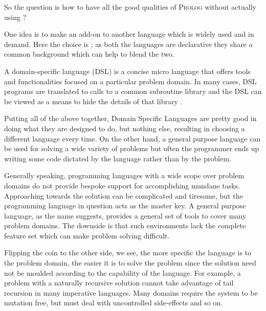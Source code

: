 \documentclass[thesis-solanki.tex]{subfiles}
\begin{document}
So the question is how to have all the good qualities of \textsc{Prolog} without actually using ?

One idea is to make  an add-on to another language which is widely used and in demand.
Here the choice is ; as both the languages are declarative they share a common background which
can help to blend the two.

A domain-specific language (DSL) is a concise micro language that offers tools and functionalities focused on a
particular problem domain.
In many cases, DSL programs are translated to calls to a common subroutine library and the DSL can be viewed as a
means to hide the details of that library \cite{van2000domain}.

Putting all of the above together, Domain Specific Languages
are pretty good in doing what they are designed to do, but nothing else, resulting in choosing a different language
every time.
On the other hand, a general purpose language can be used for solving a wide variety of problems but often the
programmer ends up writing some code dictated by the language rather than by the problem.

Generally speaking, programming languages with a wide scope over problem domains do not provide bespoke support for
accomplishing  mundane tasks.
Approaching towards the solution can be complicated and tiresome, but the programming language in question acts as
the master key.
A general purpose language, as the name suggests, provides a general set of tools to cover many problem domains.
The downside is that such environments
lack the complete feature set which can make problem solving difficult.

Flipping the coin to the other side, we see, the more specific the language is to the problem domain, the easier it
is to solve the problem since the solution need not be moulded according to the capability  of the language.
For example, a problem with a naturally recursive solution cannot take advantage of tail recursion in many
imperative languages.
Many domains require the system to be mutation free, but must deal with uncontrolled side-effects and so
on.
\end{document}
